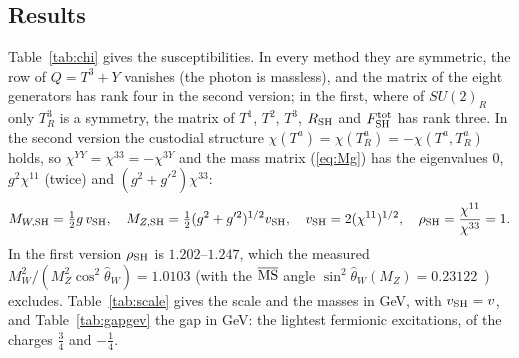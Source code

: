 \documentclass[aps,prd,onecolumn,superscriptaddress,nofootinbib,floatfix,longbibliography]{revtex4-2}
\newcommand{\SH}{{\rm SH}}
\begin{document}
\subsection{Results}

Table~\ref{tab:chi} gives the susceptibilities. In every method they are symmetric, the row of $Q=T^3+Y$ vanishes (the
photon is massless), and the matrix of the eight generators has rank four in the second version; in the first, where of
$SU(2)_R$ only $T^3_R$ is a symmetry, the matrix of $T^1$, $T^2$, $T^3$, $R_\SH$ and $F^{\rm tot}_\SH$ has rank three. In
the second version the custodial structure $\chi(T^a)=\chi(T^a_R)=-\chi(T^a,T^a_R)$ holds, so $\chi^{YY}=\chi^{33}=-\chi^{3Y}$
and the mass matrix (\ref{eq:Mg}) has the eigenvalues $0$, $g^2\chi^{11}$ (twice) and $(g^2+g'^2)\chi^{33}$:
\begin{equation}
M_{W,\SH}=\tfrac12g\,v_\SH,\quad M_{Z,\SH}=\tfrac12(g^2+g'^2)^{1/2}v_\SH,\quad v_\SH=2(\chi^{11})^{1/2},\quad
\rho_\SH=\frac{\chi^{11}}{\chi^{33}}=1 .
\label{eq:rho}
\end{equation}
In the first version $\rho_\SH$ is \ensuremath{1.202}\mbox{--}\ensuremath{1.247}, which the measured $M_W^2/(M_Z^2\cos^2\hat\theta_W)=1.0103$ (with the
$\overline{\rm MS}$ angle $\sin^2\hat\theta_W(M_Z)=0.23122$~\cite{PDG2026}) excludes. Table~\ref{tab:scale} gives the scale
and the masses in GeV, with $v_\SH=v$, and Table~\ref{tab:gapgev} the gap in GeV: the lightest fermionic excitations, of
the charges $\frac34$ and $-\frac14$.
\end{document}
